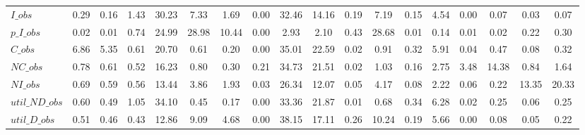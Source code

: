 \begin{center}
\begin{longtable}{lccccccccccccccccc}
$I\_obs         $	 & 	            0.29	 & 	            0.16	 & 	            1.43	 & 	           30.23	 & 	            7.33	 & 	            1.69	 & 	            0.00	 & 	           32.46	 & 	           14.16	 & 	            0.19	 & 	            7.19	 & 	            0.15	 & 	            4.54	 & 	            0.00	 & 	            0.07	 & 	            0.03	 & 	            0.07 \\ 
$p\_I\_obs      $	 & 	            0.02	 & 	            0.01	 & 	            0.74	 & 	           24.99	 & 	           28.98	 & 	           10.44	 & 	            0.00	 & 	            2.93	 & 	            2.10	 & 	            0.43	 & 	           28.68	 & 	            0.01	 & 	            0.14	 & 	            0.01	 & 	            0.02	 & 	            0.22	 & 	            0.30 \\ 
$C\_obs         $	 & 	            6.86	 & 	            5.35	 & 	            0.61	 & 	           20.70	 & 	            0.61	 & 	            0.20	 & 	            0.00	 & 	           35.01	 & 	           22.59	 & 	            0.02	 & 	            0.91	 & 	            0.32	 & 	            5.91	 & 	            0.04	 & 	            0.47	 & 	            0.08	 & 	            0.32 \\ 
$NC\_obs        $	 & 	            0.78	 & 	            0.61	 & 	            0.52	 & 	           16.23	 & 	            0.80	 & 	            0.30	 & 	            0.21	 & 	           34.73	 & 	           21.51	 & 	            0.02	 & 	            1.03	 & 	            0.16	 & 	            2.75	 & 	            3.48	 & 	           14.38	 & 	            0.84	 & 	            1.64 \\ 
$NI\_obs        $	 & 	            0.69	 & 	            0.59	 & 	            0.56	 & 	           13.44	 & 	            3.86	 & 	            1.93	 & 	            0.03	 & 	           26.34	 & 	           12.07	 & 	            0.05	 & 	            4.17	 & 	            0.08	 & 	            2.22	 & 	            0.06	 & 	            0.22	 & 	           13.35	 & 	           20.33 \\ 
$util\_ND\_obs  $	 & 	            0.60	 & 	            0.49	 & 	            1.05	 & 	           34.10	 & 	            0.45	 & 	            0.17	 & 	            0.00	 & 	           33.36	 & 	           21.87	 & 	            0.01	 & 	            0.68	 & 	            0.34	 & 	            6.28	 & 	            0.02	 & 	            0.25	 & 	            0.06	 & 	            0.25 \\ 
$util\_D\_obs   $	 & 	            0.51	 & 	            0.46	 & 	            0.43	 & 	           12.86	 & 	            9.09	 & 	            4.68	 & 	            0.00	 & 	           38.15	 & 	           17.11	 & 	            0.26	 & 	           10.24	 & 	            0.19	 & 	            5.66	 & 	            0.00	 & 	            0.08	 & 	            0.05	 & 	            0.22 \\ 

\end{longtable}
\end{center}
